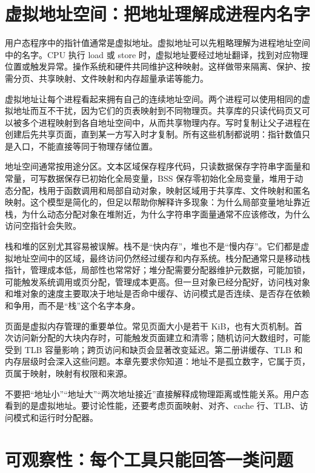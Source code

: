 \section{虚拟地址空间：把地址理解成进程内名字}

用户态程序中的指针值通常是虚拟地址。虚拟地址可以先粗略理解为进程地址空间中的名字。CPU 执行 load 或 store 时，虚拟地址要经过地址翻译，找到对应物理位置或触发异常。操作系统和硬件共同维护这种映射。这样做带来隔离、保护、按需分页、共享映射、文件映射和内存超量承诺等能力。

虚拟地址让每个进程看起来拥有自己的连续地址空间。两个进程可以使用相同的虚拟地址而互不干扰，因为它们的页表映射到不同物理页。共享库的只读代码页又可以被多个进程映射到各自地址空间中，从而共享物理内存。写时复制让父子进程在创建后先共享页面，直到某一方写入时才复制。所有这些机制都说明：指针数值只是入口，不能直接等同于物理存储位置。

地址空间通常按用途分区。文本区域保存程序代码，只读数据保存字符串字面量和常量，可写数据保存已初始化全局变量，BSS 保存零初始化全局变量，堆用于动态分配，栈用于函数调用和局部自动对象，映射区域用于共享库、文件映射和匿名映射。这个模型是简化的，但足以帮助你解释许多现象：为什么局部变量地址靠近栈，为什么动态分配对象在堆附近，为什么字符串字面量通常不应该修改，为什么访问空指针会失败。

栈和堆的区别尤其容易被误解。栈不是“快内存”，堆也不是“慢内存”。它们都是虚拟地址空间中的区域，最终访问仍然经过缓存和内存系统。栈分配通常只是移动栈指针，管理成本低，局部性也常常好；堆分配需要分配器维护元数据，可能加锁，可能触发系统调用或页分配，管理成本更高。但一旦对象已经分配好，访问栈对象和堆对象的速度主要取决于地址是否命中缓存、访问模式是否连续、是否存在依赖和争用，而不是“栈”这个名字本身。

页面是虚拟内存管理的重要单位。常见页面大小是若干 KiB，也有大页机制。首次访问新分配的大块内存时，可能触发页面建立和清零；随机访问大数组时，可能受到 TLB 容量影响；跨页访问和缺页会显著改变延迟。第二册讲缓存、TLB 和内存层级时会深入这些问题。本章先要求你知道：地址不是孤立数字，它属于页，页属于映射，映射有权限和来源。

\begin{warningbox}
不要把“地址小”“地址大”“两次地址接近”直接解释成物理距离或性能关系。用户态看到的是虚拟地址。要讨论性能，还要考虑页面映射、对齐、cache 行、TLB、访问模式和运行时分配器。
\end{warningbox}

\section{可观察性：每个工具只能回答一类问题}

